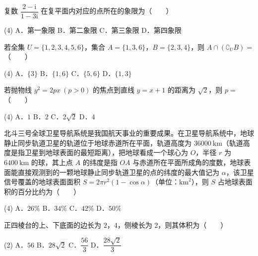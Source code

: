\begin{question}
复数 $\dfrac{2-\mathrm i}{1-3\mathrm i}$ 在复平面内对应的点所在的象限为\mbox{（　　）}

\begin{gkopts}(4)
\task A．第一象限
\task B．第二象限
\task C．第三象限
\task D．第四象限
\end{gkopts}

\end{question}
\begin{question}
若全集 $U=\{1,2,3,4,5,6\}$，集合 $A=\{1,3,6\}$，$B=\{2,3,4\}$，则 $A\cap\left(\complement_U B\right)=$\mbox{（　　）}

\begin{gkopts}(4)
\task A．$\{3\}$
\task B．$\{1,6\}$
\task C．$\{5,6\}$
\task D．$\{1,3\}$
\end{gkopts}

\end{question}
\begin{question}
若抛物线 $y^{2}=2px\ (p>0)$ 的焦点到直线 $y=x+1$ 的距离为 $\sqrt2$，则 $p=$\mbox{（　　）}

\begin{gkopts}(4)
\task A．$1$
\task B．$2$
\task C．$2\sqrt2$
\task D．$4$
\end{gkopts}

\end{question}
\begin{question}
北斗三号全球卫星导航系统是我国航天事业的重要成果。在卫星导航系统中，地球静止同步轨道卫星的轨道位于地球赤道所在平面，轨道高度为 $36000\ \mathrm{km}$（轨道高度是指卫星到地球表面的最短距离），把地球看成一个球心为 $O$，半径 $r$ 为 $6400\ \mathrm{km}$ 的球，其上点 $A$ 的纬度是指 $OA$ 与赤道所在平面所成角的度数，地球表面能直接观测到的一颗地球静止同步轨道卫星的点的纬度的最大值记为 $\alpha$，该卫星信号覆盖的地球表面面积 $S=2\pi r^{2}(1-\cos\alpha)$（单位：$\mathrm{km}^{2}$），则 $S$ 占地球表面积的百分比约为\mbox{（　　）}

\begin{gkopts}(4)
\task A．$26\%$
\task B．$34\%$
\task C．$42\%$
\task D．$50\%$
\end{gkopts}

\end{question}
\begin{question}
正四棱台的上、下底面的边长为 $2$，$4$，侧棱长为 $2$，则其体积为\mbox{（　　）}

\begin{gkopts}(2)
\task A．$56$
\task B．$28\sqrt2$
\task C．$\dfrac{56}3$
\task D．$\dfrac{28\sqrt2}3$
\end{gkopts}

\end{question}

